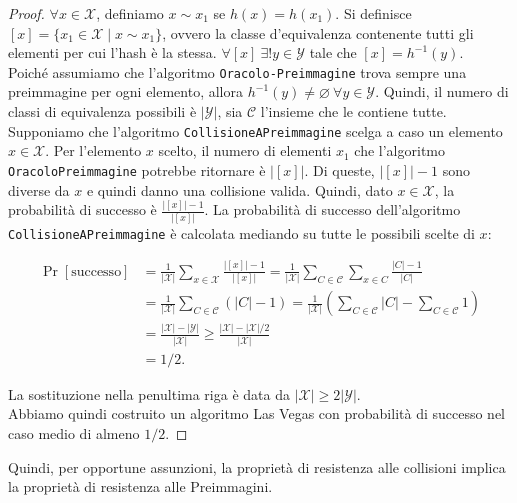 \begin{proof}
    $\forall x \in \mathcal{X}$, definiamo $x \sim x_1$ se $h(x)=h(x_1)$. Si definisce $[x]=\{x_1 \in \mathcal{X} \mid x \sim x_1\}$, ovvero la classe d'equivalenza contenente tutti gli elementi per cui l'hash è la stessa. $\forall [x] \ \exists !  y \in \mathcal{Y} $ tale che $[x]=h^{-1}(y)$. \\ Poiché assumiamo che l'algoritmo \texttt{Oracolo-Preimmagine} trova sempre una preimmagine per ogni elemento, allora $h^{-1}(y) \neq \varnothing \ \forall y \in \mathcal{Y}$. Quindi, il numero di classi di equivalenza possibili è $|\mathcal{Y}|$, sia $\mathcal{C}$ l'insieme che le contiene tutte. \\ Supponiamo che l'algoritmo \texttt{CollisioneAPreimmagine} scelga a caso un elemento $x \in \mathcal{X}$. Per l'elemento $x$ scelto, il numero di elementi $x_1$ che l'algoritmo \texttt{OracoloPreimmagine} potrebbe ritornare è $|[x]|$. Di queste, $|[x]|-1$ sono diverse da $x$ e quindi danno una collisione valida. Quindi, dato $x \in \mathcal{X}$, la probabilità di successo è $\frac{|[x]|-1}{|[x]|}$. La probabilità di successo dell'algoritmo \texttt{CollisioneAPreimmagine} è calcolata mediando su tutte le possibili scelte di $x$:

    \begin{align*}
        \Pr[\text{successo}] &= \frac{1}{\mathcal{|X|}} \sum_{x \in \mathcal{X}}\frac{|[x]|-1}{|[x]|} = \frac{1}{|\mathcal{X}|} \sum_{C \in \mathcal{C}} \sum_{x \in C} \frac{|C|-1}{|C|}\\ 
        &= \frac{1}{\mathcal{|X|}} \sum_{C \in \mathcal{C}} (|C|-1) = \frac{1}{\mathcal{|X|}} \left(\sum_{C \in \mathcal{C}} |C| -\sum_{C \in \mathcal{C}} 1\right) \\ 
        &= \frac{|\mathcal{X}| - |\mathcal{Y}|}{|\mathcal{X}|} \geq \frac{|\mathcal{X}| - |\mathcal{X}|/2}{|\mathcal{X}|} \\ 
        &= 1/2. 
    \end{align*}

    \noindent La sostituzione nella penultima riga è data da $|\mathcal{X}| \geq 2 |\mathcal{Y}|$. \\ Abbiamo quindi costruito un algoritmo Las Vegas con probabilità di successo nel caso medio di almeno $1/2$. 
\end{proof}

Quindi, per opportune assunzioni, la proprietà di resistenza alle collisioni implica la proprietà di resistenza alle Preimmagini.

